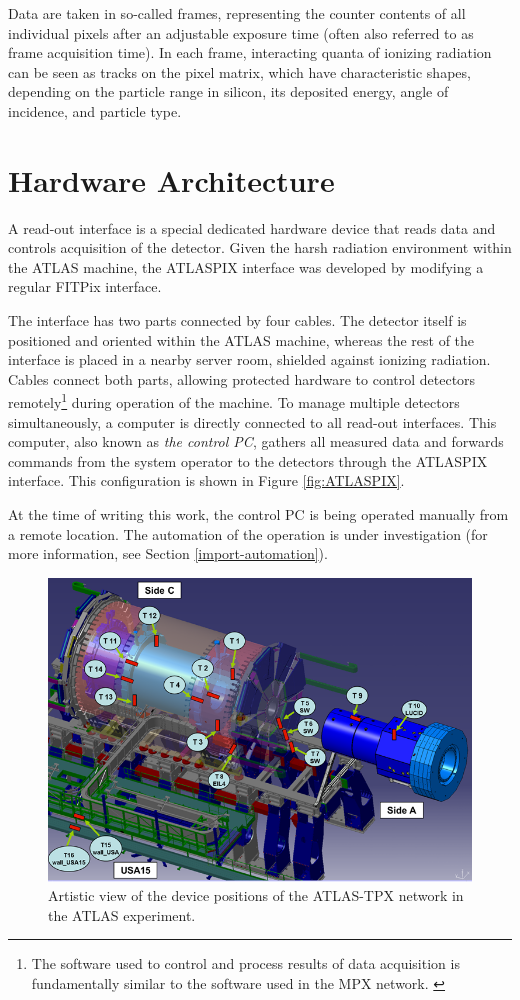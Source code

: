\documentclass[journal]{IEEEtran}
\begin{document}
Data are taken in so-called frames, representing the counter contents of all individual pixels after an adjustable exposure time (often also referred to as frame acquisition time). In each frame, interacting quanta of ionizing radiation can be seen as tracks on the pixel matrix, which have characteristic shapes, depending on the particle range in silicon, its deposited energy, angle of incidence, and particle type. 

\section{\label{sec:hardware}Hardware Architecture}
A read-out interface is a special dedicated hardware device that reads data and controls acquisition of the detector. \cite{Pixelman} Given the harsh radiation environment within the ATLAS machine, the ATLASPIX interface was developed by modifying a regular FITPix interface. \cite{FITPix}

The interface has two parts connected by four cables. The detector itself is positioned and oriented within the ATLAS machine, whereas the rest of the interface is placed in a nearby server room, shielded against ionizing radiation. Cables connect both parts, allowing protected hardware to control detectors remotely\footnote{The software used to control and process results of data acquisition is fundamentally similar to the software used in the MPX network. \cite{ProcessingSoftware}} during operation of the machine. To manage multiple detectors simultaneously, a computer is directly connected to all read-out interfaces. This computer, also known as \textit{the control PC}, gathers all measured data and forwards commands from the system operator to the detectors through the ATLASPIX interface. This configuration is shown in Figure \ref{fig:ATLASPIX}.

At the time of writing this work, the control PC is being operated manually from a remote location. The automation of the operation is under investigation (for more information, see Section \ref{import-automation}).

\begin{figure}[tbp]
	\centering
        \includegraphics[clip, width=.45\textwidth, angle = 0 ]{Plots/ATLASTPX.png}
      \caption {Artistic view of the device positions of the ATLAS-TPX network in the ATLAS experiment.}
    \label{fig:positions}
\end{figure}
\end{document}
